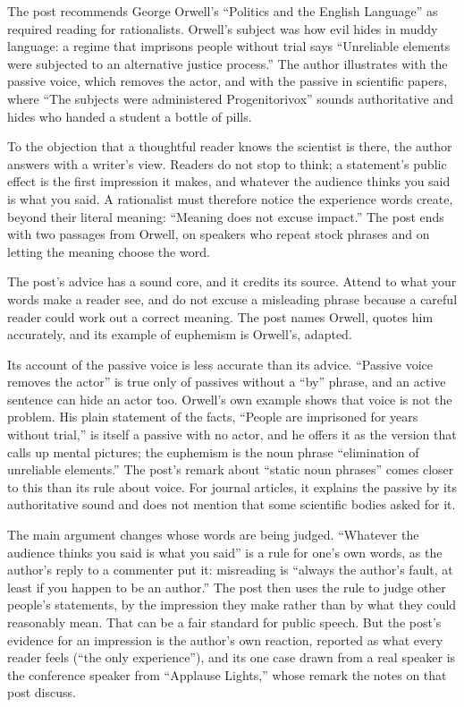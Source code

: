 \begin{afterword}
\summaryhead

The post recommends George Orwell's ``Politics and the English Language'' as required reading for rationalists. Orwell's subject was how evil hides in muddy language: a regime that imprisons people without trial says ``Unreliable elements were subjected to an alternative justice process.'' The author illustrates with the passive voice, which removes the actor, and with the passive in scientific papers, where ``The subjects were administered Progenitorivox'' sounds authoritative and hides who handed a student a bottle of pills.

To the objection that a thoughtful reader knows the scientist is there, the author answers with a writer's view. Readers do not stop to think; a statement's public effect is the first impression it makes, and whatever the audience thinks you said is what you said. A rationalist must therefore notice the experience words create, beyond their literal meaning: ``Meaning does not excuse impact.'' The post ends with two passages from Orwell, on speakers who repeat stock phrases and on letting the meaning choose the word.

\responsehead

The post's advice has a sound core, and it credits its source. Attend to what your words make a reader see, and do not excuse a misleading phrase because a careful reader could work out a correct meaning. The post names Orwell, quotes him accurately, and its example of euphemism is Orwell's, adapted.

Its account of the passive voice is less accurate than its advice. ``Passive voice removes the actor'' is true only of passives without a ``by'' phrase, and an active sentence can hide an actor too. Orwell's own example shows that voice is not the problem. His plain statement of the facts, ``People are imprisoned for years without trial,'' is itself a passive with no actor, and he offers it as the version that calls up mental pictures; the euphemism is the noun phrase ``elimination of unreliable elements.'' The post's remark about ``static noun phrases'' comes closer to this than its rule about voice. For journal articles, it explains the passive by its authoritative sound and does not mention that some scientific bodies asked for it.

The main argument changes whose words are being judged. ``Whatever the audience thinks you said is what you said'' is a rule for one's own words, as the author's reply to a commenter put it: misreading is ``always the author's fault, at least if you happen to be an author.'' The post then uses the rule to judge other people's statements, by the impression they make rather than by what they could reasonably mean. That can be a fair standard for public speech. But the post's evidence for an impression is the author's own reaction, reported as what every reader feels (``the only experience''), and its one case drawn from a real speaker is the conference speaker from ``Applause Lights,'' whose remark the notes on that post discuss.


\end{afterword}
